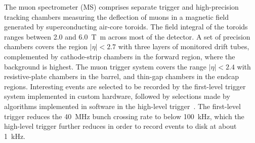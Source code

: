 The muon spectrometer (MS) comprises separate trigger and
high-precision tracking chambers measuring the deflection of muons in a magnetic field generated by superconducting air-core toroids.
The field integral of the toroids ranges between \num{2.0} and \SI{6.0}{\tesla\metre}
across most of the detector. 
A set of precision chambers covers the region \(|\eta| < 2.7\) with three layers of monitored drift tubes,
complemented by cathode-strip chambers in the forward region, where the background is highest.
The muon trigger system covers the range \(|\eta| < 2.4\) with resistive-plate chambers in the barrel, and thin-gap chambers in the endcap regions.
Interesting events are selected to be recorded by the first-level trigger system implemented in custom hardware, followed by selections made by algorithms implemented in software in the high-level trigger~\cite{PERF-2011-02}. 
The first-level trigger reduces the 40~MHz bunch crossing rate to below \SI{100}{\kHz}, which the high-level trigger further reduces in order to record events to disk at about \SI{1}{\kHz}.

